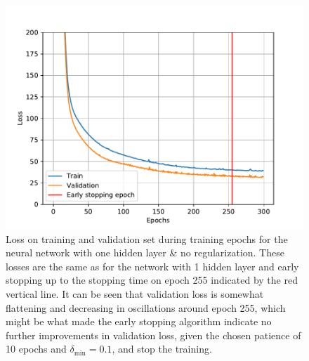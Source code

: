 \begin{figure}
    \centering
    \includegraphics[width=\textwidth]{pics/figure_Boston_NN_1hidden_noreg_loss.pdf}
    \caption{Loss on training and validation set during training epochs for the neural network with one hidden layer \& no regularization. These losses are the same as for the network with 1 hidden layer and early stopping up to the stopping time on epoch 255 indicated by the red vertical line. It can be seen that validation loss is somewhat flattening and decreasing in oscillations around epoch 255, which might be what made the early stopping algorithm indicate no further improvements in validation loss, given the chosen patience of 10 epochs and $\delta_{\text{min}} = 0.1$, and stop the training.}
    \label{fig:Boston_NN_1hidden_noreg_loss}
\end{figure}
\clearpage

